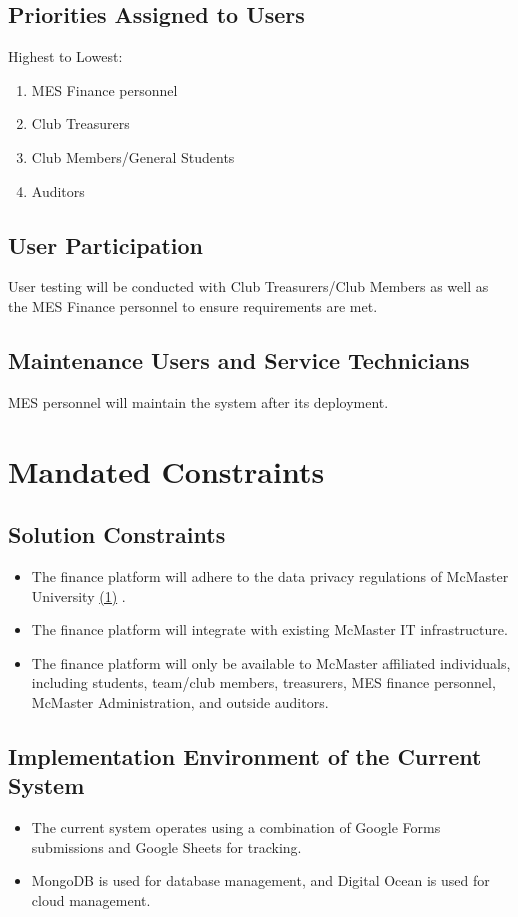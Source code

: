 \documentclass[12pt]{article}
\begin{document}
\subsection{Priorities Assigned to Users}
Highest to Lowest:
\begin{enumerate}
    \item MES Finance personnel
    \item Club Treasurers
    \item Club Members/General Students
    \item Auditors
\end{enumerate}

\subsection{User Participation}
User testing will be conducted with Club Treasurers/Club Members as well as the MES Finance personnel to ensure requirements are met.

\subsection{Maintenance Users and Service Technicians}
MES personnel will maintain the system after its deployment.


\section{Mandated Constraints}
\subsection{Solution Constraints}
\begin{itemize}
    \item The finance platform will adhere to the data privacy regulations of McMaster University \hyperlink{Ref1}{(1)} .
    \item The finance platform will integrate with existing McMaster IT infrastructure.
    \item The finance platform will only be available to McMaster affiliated individuals, including students, team/club members, treasurers, MES finance personnel, McMaster Administration, and outside auditors.
\end{itemize}

\subsection{Implementation Environment of the Current System}
\begin{itemize}
    \item The current system operates using a combination of Google Forms submissions and Google Sheets for tracking. 
    \item MongoDB is used for database management, and Digital Ocean is used for cloud management.
\end{itemize}
\end{document}
